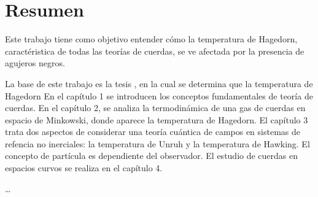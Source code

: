 \chapter*{Resumen}

Este trabajo tiene como objetivo entender cómo la temperatura de Hagedorn, 
caractéristica de todas las teorías de cuerdas, se ve afectada por la presencia de agujeros
negros.

La base de este trabajo es la tesis \cite{Mertes2015}, en la cual se determina que la temperatura
de Hagedorn 
En el capítulo 1 se introducen los conceptos fundamentales de teoría de cuerdas.
En el capítulo 2, se analiza la termodinámica de una gas de cuerdas en
espacio de Minkowski, donde aparece la temperatura de Hagedorn.
El capítulo 3 trata dos aspectos de considerar una teoría cuántica de campos en 
sistemas de refencia no inerciales: la temperatura de Unruh y la temperatura de Hawking.
El concepto de partícula es dependiente del observador.
El estudio de cuerdas en espacios curvos se realiza en el capítulo 4. 



\ldots

